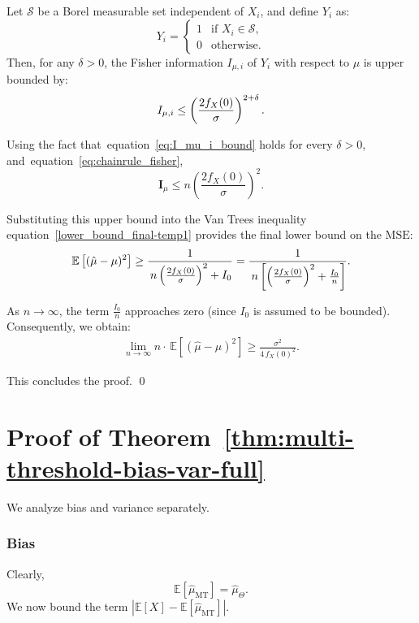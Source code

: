 \documentclass[10pt]{article} %
\def\eqref#1{equation~\ref{#1}}
\theoremstyle{plain}
\theoremstyle{definition}
\theoremstyle{remark}
\newcommand{\bE}{\mathbb E}
\newcommand{\bfI}{\mathbf I}
\newcommand{\cS}{\mathcal S}
\newcommand{\mse}{\mathrm{MSE}}
\begin{document}
\begin{lemma}\label{lem:Gamma_bound}
Let \( \cS \) be a Borel measurable set independent of $X_i$, and define \( Y_i \) as:
    \[
    Y_i =
    \begin{cases} 
        1 & \text{if } X_i \in \cS, \\
        0 & \text{otherwise}.
    \end{cases}
    \]
    Then, for any $\delta>0$, the Fisher information \(I_{\mu,i}\) of \(Y_{i}\) with respect to \(\mu\) is upper bounded by: 
    \begin{equation}\label{eq:I_mu_i_bound}
        I_{\mu,i} \leq  \left(\frac{2 f_X(0)}{\sigma}\right)^{2+\delta}. \notag
    \end{equation}
\end{lemma}
Using the fact that~\eqref{eq:I_mu_i_bound} holds
for every $\delta>0$, and~\eqref{eq:chainrule_fisher}, 
\[
\bfI_{\mu} \leq n\left(\frac{2 f_X(0)}{\sigma}\right)^{2}.
\]


Substituting this upper bound into the Van Trees inequality \eqref{lower_bound_final-temp1} provides the final lower bound on the \(\mse\):
\begin{align}
    \bE \left[ (\hat{\mu} - \mu)^2 \right] 
     \geq   
    \frac{1}{\, n \left(\frac{2 f_X(0)}{\sigma}\right)^{2} + I_{0} }
     =  
    \frac{1}{\, n \left[\left(\frac{2 f_X(0)}{\sigma}\right)^{2} + \frac{I_{0}}{n} \right]}. \notag
\end{align}

As \(n \to \infty\), the term \(\frac{I_{0}}{n}\) approaches zero (since \(I_{0}\) is assumed to be bounded). Consequently, we obtain:
\begin{align}
   \lim_{n \rightarrow \infty} n \cdot \,\bE \left[ (\hat{\mu} - \mu)^2 \right] 
     \geq   
    \frac{\sigma^2}{4\,f_X(0)^2}.
\end{align}

This concludes the proof.
\qed

\section{Proof of Theorem~\ref{thm:multi-threshold-bias-var-full}}
\label{sec:prf_multi_threshold}

We analyze bias and variance separately.
\subsubsection{Bias}
Clearly,
\[
\bE[\hat{\mu}_{\text{MT}}] = \hat{\mu}_{\Theta}.
\]
We now bound the term
\(
|\bE[X] - \bE[\hat{\mu}_{\text{MT}}]|.
\)
\end{document}
